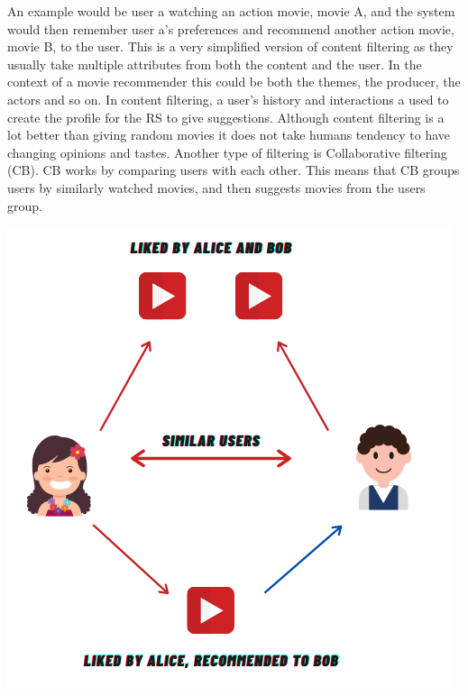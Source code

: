 An example would be user a watching an action movie, movie A, and the system would then remember user a's preferences
and recommend another action movie, movie B, to the user.\newline
This is a very simplified version of content filtering as they usually take multiple attributes from both the content
and the user.
In the context of a movie recommender this could be both the themes, the producer, the actors and so on.\newline
In content filtering, a user's history and interactions a used to create the profile for the RS to give suggestions.
Although content filtering is a lot better than giving random movies it does not take humans tendency to have changing
opinions and tastes.
Another type of filtering is Collaborative filtering (CB).
CB works by comparing users with each other.
This means that CB groups users by similarly watched movies, and then suggests movies from the users group.

\includegraphics[width=\textwidth]{images/collaborative-filtering}

